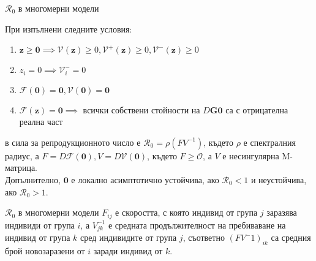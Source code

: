 \begin{frame}[t]{$\mathscr{R}_0$ в многомерни модели}
  \begin{theorem}
    При изпълнени следните условия:
    \begin{enumerate}
      \item $\mathbf{z} \geq \mathbf{0} \implies \mathscr{V}(\mathbf{z}) \geq 0, \mathscr{V}^+(\mathbf{z}) \geq 0, \mathscr{V}^-(\mathbf{z}) \geq 0$
      \item $z_i = 0 \implies \mathscr{V}_{i}^- = 0$
      \item $\mathscr{F}(\mathbf{0}) = \mathbf{0}, \mathscr{V}(\mathbf{0}) = \mathbf{0}$
      \item $\mathscr{F}(\mathbf{z}) = \mathbf{0} \implies$ всички собствени стойности на $D\mathbf{G}{\mathbf{0}}$ са с отрицателна реална част
    \end{enumerate}
    в сила за репродукционното число е $\mathscr{R}_0 = \rho(F V^{-1})$, където $\rho$ е спектралния радиус, а $F = D\mathscr{F}(\mathbf{0}), V = D\mathscr{V}(\mathbf{0})$, където $F \geq \mathscr{O}$, а $V$ е несингулярна M-матрица. \\
    Допълнително, $\mathbf{0}$ е локално асимптотично устойчива, ако $\mathscr{R}_0 < 1$ и неустойчива, ако $\mathscr{R}_0 > 1$.
  \end{theorem}
\end{frame}

\begin{frame}[t]{$\mathscr{R}_0$ в многомерни модели}
  $F_{ij}$ е скоростта, с която индивид от група $j$ заразява индивиди от група $i$, а $V^{-1}_{jk}$ е средната продължителност на пребиваване на индивид от група $k$ сред индивидите от група $j$, съответно $(F V^-1)_{ik}$ са средния брой новозаразени от $i$ заради индивид от $k$.
\end{frame}
